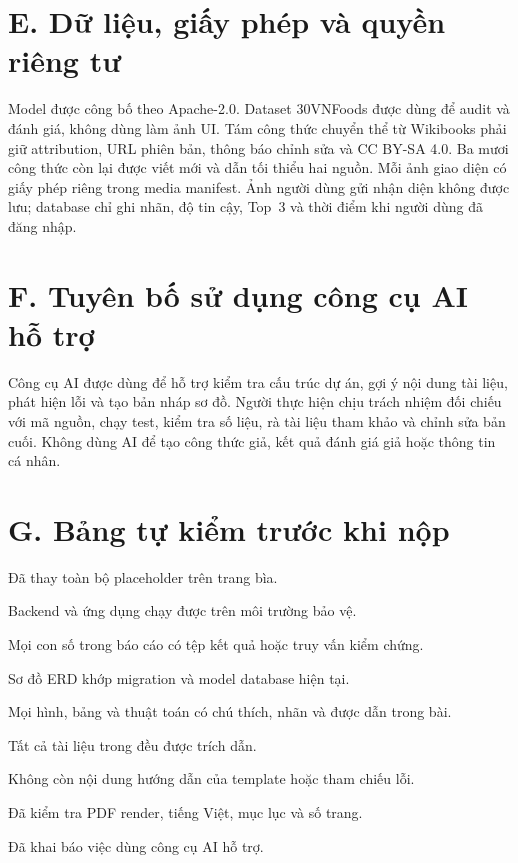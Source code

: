 \section*{E. Dữ liệu, giấy phép và quyền riêng tư}
{}

Model được công bố theo Apache-2.0. Dataset 30VNFoods được dùng để audit và
đánh giá, không dùng làm ảnh UI. Tám công thức chuyển thể từ Wikibooks phải
giữ attribution, URL phiên bản, thông báo chỉnh sửa và CC BY-SA 4.0. Ba mươi
công thức còn lại được viết mới và dẫn tối thiểu hai nguồn. Mỗi ảnh giao diện
có giấy phép riêng trong media manifest. Ảnh người dùng gửi nhận diện không
được lưu; database chỉ ghi nhãn, độ tin cậy, Top~3 và thời điểm khi người dùng
đã đăng nhập.

\section*{F. Tuyên bố sử dụng công cụ AI hỗ trợ}
{}

Công cụ AI được dùng để hỗ trợ kiểm tra cấu trúc dự án, gợi ý nội dung tài
liệu, phát hiện lỗi và tạo bản nháp sơ đồ. Người thực hiện chịu trách nhiệm
đối chiếu với mã nguồn, chạy test, kiểm tra số liệu, rà tài liệu tham khảo và
chỉnh sửa bản cuối. Không dùng AI để tạo công thức giả, kết quả đánh giá giả
hoặc thông tin cá nhân.

\section*{G. Bảng tự kiểm trước khi nộp}
{}

\begin{tukiem}
  \item Đã thay toàn bộ placeholder trên trang bìa.
  \item Backend và ứng dụng chạy được trên môi trường bảo vệ.
  \item Mọi con số trong báo cáo có tệp kết quả hoặc truy vấn kiểm chứng.
  \item Sơ đồ ERD khớp migration và model database hiện tại.
  \item Mọi hình, bảng và thuật toán có chú thích, nhãn và được dẫn trong bài.
  \item Tất cả tài liệu trong  đều được trích dẫn.
  \item Không còn nội dung hướng dẫn của template hoặc tham chiếu lỗi.
  \item Đã kiểm tra PDF render, tiếng Việt, mục lục và số trang.
  \item Đã khai báo việc dùng công cụ AI hỗ trợ.
\end{tukiem}

